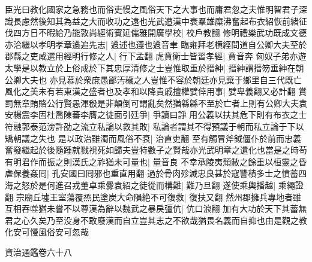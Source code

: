 臣光曰教化國家之急務也而俗吏慢之風俗天下之大事也而庸君忽之夫惟明智君子深識長慮然後知其為益之大而收功之遠也光武遭漢中衰羣雄糜沸奮起布衣紹恢前緒征伐四方日不暇給乃能敦尚經術賓延儒雅開廣學校|{
	校戶教翻}
修明禮樂武功既成文德亦洽繼以孝明孝章遹追先志|{
	遹述也遵也遹音聿}
臨雍拜老横經問道自公卿大夫至於郡縣之吏咸選用經明行修之人|{
	行下孟翻}
虎賁衛士皆習孝經|{
	賁音奔}
匈奴子弟亦遊太學是以教立於上俗成於下其忠厚清修之士豈惟取重於搢紳|{
	搢紳謂搢笏垂紳在朝公卿大夫也}
亦見慕於衆庶愚鄙汚穢之人豈惟不容於朝廷亦見棄于鄉里自三代既亡風化之美未有若東漢之盛者也及孝和以降貴戚擅權嬖倖用事|{
	嬖卑義翻又必計翻}
賞罰無章賄賂公行賢愚渾殽是非顛倒可謂亂矣然猶緜緜不至於亡者上則有公卿大夫袁安楊震李固杜喬陳蕃李膺之徒面引廷爭|{
	爭讀曰諍}
用公義以扶其危下則有布衣之士符融郭泰范滂許劭之流立私論以救其敗|{
	私論者謂其不得預議于朝而私立論于下以矯朝議之失也}
是以政治雖濁而風俗不衰|{
	治直吏翻}
至有觸冒斧鉞僵仆於前而忠義奮發繼起於後隨踵就戮視死如歸夫豈特數子之賢哉亦光武明章之遺化也當是之時苟有明君作而振之則漢氏之祚猶未可量也|{
	量音良}
不幸承陵夷頹敝之餘重以桓靈之昏虐保養姦囘|{
	孔安國曰囘邪也重直用翻}
過於骨肉殄滅忠良甚於寇讐積多士之憤蓄四海之怒於是何進召戎董卓乘釁袁紹之徒從而構難|{
	難乃旦翻}
遂使乘輿播越|{
	乘繩證翻}
宗廟丘墟王室蕩覆烝民塗炭大命隕絶不可復救|{
	復扶又翻}
然州郡擁兵專地者雖互相吞噬猶未嘗不以尊漢為辭以魏武之暴戾彊伉|{
	伉口浪翻}
加有大功於天下其蓄無君之心久矣乃至没身不敢廢漢而自立豈其志之不欲哉猶畏名義而自抑也由是觀之教化安可慢風俗安可忽哉

資治通鑑卷六十八
